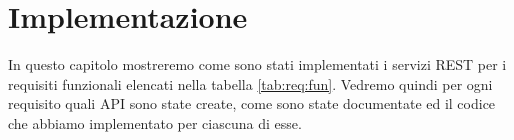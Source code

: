 \chapter{Implementazione}
In questo capitolo mostreremo come sono stati implementati i servizi REST per i requisiti funzionali elencati nella tabella \ref{tab:req:fun}.
Vedremo quindi per ogni requisito quali API sono state create, come sono state documentate ed il codice che abbiamo implementato per ciascuna di esse.
